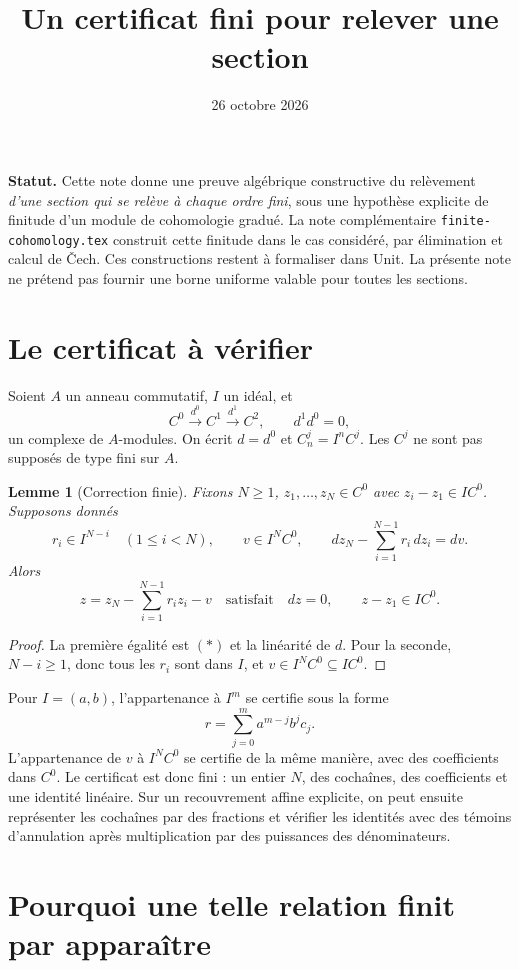 \documentclass[11pt]{amsart}
\title{Un certificat fini pour relever une section}
\date{26 octobre 2026}
\newtheorem{lemma}[proposition]{Lemme}
\theoremstyle{remark}
\begin{document}
\maketitle

\noindent\textbf{Statut.}
Cette note donne une preuve algébrique constructive du relèvement
\emph{d'une section qui se relève à chaque ordre fini}, sous une hypothèse
explicite de finitude d'un module de cohomologie gradué.
La note complémentaire \texttt{finite-cohomology.tex} construit cette
finitude dans le cas considéré, par élimination et calcul de Čech.
Ces constructions restent à formaliser dans Unit. La présente note
ne prétend pas fournir une borne uniforme valable pour toutes les sections.

\section{Le certificat à vérifier}

Soient $A$ un anneau commutatif, $I$ un idéal, et
\[
 C^0\xrightarrow{d^0}C^1\xrightarrow{d^1}C^2,
 \qquad d^1d^0=0,
\]
un complexe de $A$-modules. On écrit $d=d^0$ et $C_n^j=I^nC^j$.
Les $C^j$ ne sont pas supposés de type fini sur $A$.

\begin{lemma}[Correction finie]\label{lem:correction}
Fixons $N\geq1$, $z_1,\ldots,z_N\in C^0$ avec
$z_i-z_1\in IC^0$. Supposons donnés
\[
 r_i\in I^{N-i}\quad(1\leq i<N),\qquad v\in I^NC^0,
 \qquad
 dz_N-\sum_{i=1}^{N-1}r_i\,dz_i=dv.
 \tag{*}
\]
Alors
\[
 z=z_N-\sum_{i=1}^{N-1}r_i z_i-v
 \quad\text{satisfait}\quad dz=0,\qquad z-z_1\in IC^0.
\]
\end{lemma}
\begin{proof}
La première égalité est $(*)$ et la linéarité de $d$.
Pour la seconde, $N-i\geq1$, donc tous les $r_i$ sont dans $I$,
et $v\in I^NC^0\subseteq IC^0$.
\end{proof}

Pour $I=(a,b)$, l'appartenance à $I^m$ se certifie sous la forme
\[
 r=\sum_{j=0}^{m}a^{m-j}b^j c_j.
\]
L'appartenance de $v$ à $I^NC^0$ se certifie de la même manière,
avec des coefficients dans $C^0$. Le certificat est donc fini :
un entier $N$, des cochaînes, des coefficients et une identité linéaire.
Sur un recouvrement affine explicite, on peut ensuite représenter les
cochaînes par des fractions et vérifier les identités avec des témoins
d'annulation après multiplication par des puissances des dénominateurs.

\section{Pourquoi une telle relation finit par apparaître}
\end{document}
